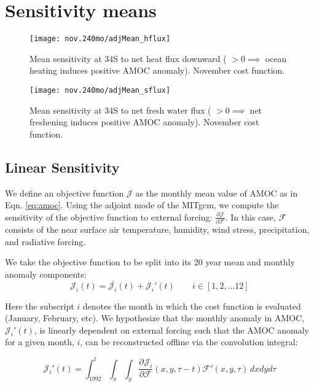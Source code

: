 \documentclass[a4paper,11pt]{article}
\newcommand{\pderiv}[3][]{%
  \ensuremath{\frac{\partial^{#1} {#2}}{\partial {#3}^{#1}}}}
\begin{document}
 \section{Sensitivity means}

   \begin{figure}
    \centering
    \texttt{[image: nov.240mo/adjMean\_hflux]}
    \caption{Mean sensitivity at 34S to net heat flux downward ( $ >0 \implies $ ocean heating induces positive AMOC anomaly). November cost function. }
    \label{fig:novhflux}
   \end{figure}

   \begin{figure}
    \centering
    \texttt{[image: nov.240mo/adjMean\_sflux]}
    \caption{Mean sensitivity at 34S to net fresh water flux ( $>0 \implies$ net freshening induces positive AMOC anomaly). November cost function.}
    \label{fig:novsflux}
   \end{figure}

  \subsection{Linear Sensitivity}
  \label{linearSensitivity}
  
  We define an objective function $\mathcal{J}$ as the monthly mean value of AMOC as in Eqn. \ref{eq:amoc}. Using the adjoint mode of the MITgcm, we compute the sensitivity of the objective function to external forcing: $\pderiv{\mathcal{J}}{\mathcal{F}}$. In this case, $\mathcal{F}$ consists of the near surface air temperature, humidity, wind stress, precipitation, and radiative forcing.  
	
  We take the objective function to be split into its 20 year mean and monthly anomaly components: 
	\begin{equation}
	  \mathcal{J}_i(t) = \bar{\mathcal{J}_i}(t) + \mathcal{J}_i'(t) \qquad i \in [1, 2, ... 12]
	\end{equation}

  Here the subscript $i$ denotes the month in which the cost function is evaluated (January, February, etc). We hypothesize that the monthly anomaly in AMOC, $\mathcal{J}_i'(t)$, is linearly dependent on external forcing such that the AMOC anomaly for a given month, $i$, can be reconstructed offline via the convolution integral:
 
	\begin{equation}
	  \mathcal{J}_i'(t) = \int_{1992}^{t}\int_x \int_y\pderiv{\mathcal{J}_i}{\mathcal{F}}(x,y,\tau-t)\mathcal{F}'(x,y,\tau)\, dxdyd\tau  
	  \label{eq:reconstruct}
	\end{equation}
\end{document}
